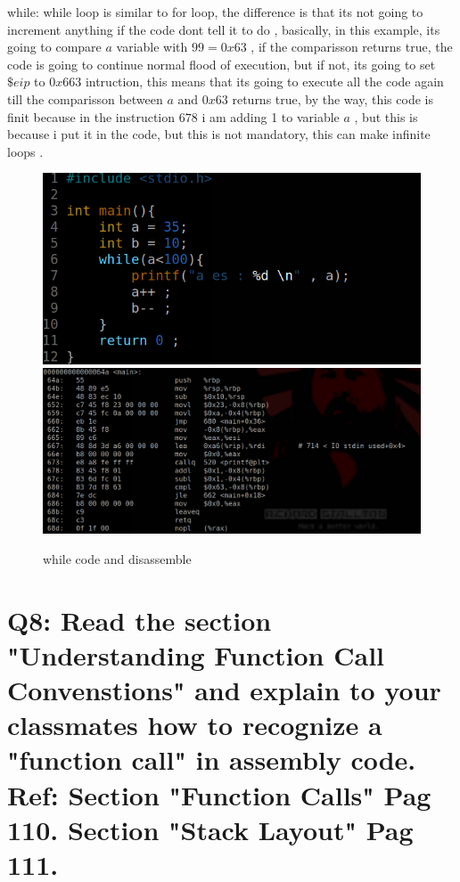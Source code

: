 \documentclass[10pt,a4paper]{article} %
\begin{document}
        while:
        while loop is similar to for loop, the difference is that its not going
        to increment anything if the code dont tell it to do , basically, in
        this example, its going to compare $ a  $ variable with $ 99= 0x63  $ ,
        if the comparisson returns true, the code is going to continue normal
        flood of execution, but if not, its going to set $ \$eip  $ to $ 0x663
        $ intruction, this means that its going to execute all the code again
        till the comparisson between $ a  $ and $ 0x63  $ returns true, by the
        way, this code is finit because in the instruction $ 678  $ i am adding
        1 to variable $ a  $ , but this is because i put it in the code, but
        this is not mandatory, this can make infinite loops .
        \begin{figure}[h!]
            \centering
            \includegraphics[width=0.8\linewidth]{whilecode.png}
            \includegraphics[width=0.8\linewidth]{whiledis.png}
            \caption{while code and disassemble}
            \label{while}
        \end{figure}

    \newpage
    \section{Q8: Read the section "Understanding Function Call Convenstions"
        and explain to your classmates how to recognize a "function call" in
        assembly code.
        Ref: Section "Function Calls" Pag 110. Section "Stack Layout" Pag 111. }
\end{document}
